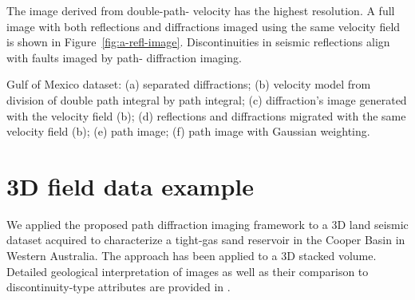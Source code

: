 The image derived from double-path- velocity has the highest resolution. 
A full image with both reflections and diffractions imaged using
the same velocity field is shown in Figure~\ref{fig:a-refl-image}.
Discontinuities in seismic reflections align with faults imaged
by path- diffraction imaging.






{Gulf of Mexico dataset: (a) separated diffractions; (b) velocity model from division of double path
integral by path integral;
(c) diffraction's image generated with the velocity field (b); (d) reflections and diffractions migrated with the same 
velocity field (b); (e) path image; (f) path
 image with Gaussian weighting.}

\section{3D field data example}

We applied the proposed path diffraction imaging framework to a 3D land seismic dataset
acquired to characterize a tight-gas sand reservoir in the Cooper Basin in Western Australia.
The approach has been applied to a 3D stacked volume. Detailed geological interpretation of 
images as well as their comparison to discontinuity-type attributes are provided in \cite{tyiasning2016comparison}.

